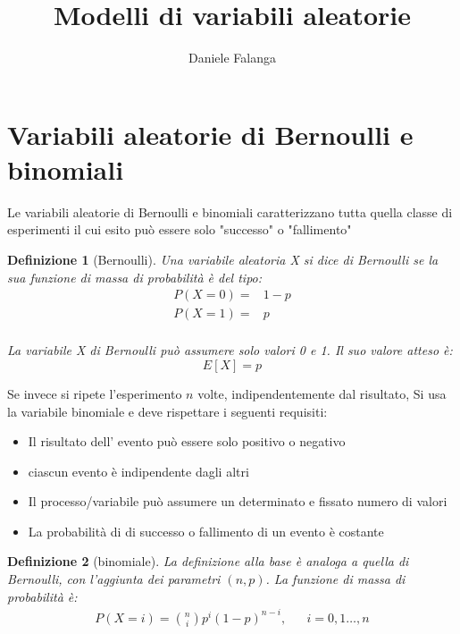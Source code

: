 \documentclass[12pt]{article}
\title{\textbf{Modelli di variabili aleatorie}}
\author{Daniele Falanga}
\date{}
\newtheorem{definition}{Definizione}[section]
\begin{document}
\maketitle

\section{Variabili aleatorie di Bernoulli e binomiali}
Le variabili aleatorie di Bernoulli e binomiali caratterizzano tutta quella classe
di esperimenti il cui esito può essere solo "successo" o "fallimento"

\begin{definition}[Bernoulli]
    Una variabile aleatoria X si dice di Bernoulli se la sua funzione di massa
    di probabilità è del tipo: 
    \begin{align*}
        P(X = 0) = & 1-p \\
        P(X=1) = &  p \\
    \end{align*}

    La variabile X di Bernoulli può assumere solo valori 0 e 1. 
    \newline
    Il suo valore atteso è:
    \[
    E[X] = p    
    \]
\end{definition}

Se invece si ripete l'esperimento \(n\) volte, indipendentemente dal risultato, 
Si usa la variabile binomiale e deve rispettare i seguenti requisiti:
\begin{itemize}
    \item Il risultato dell' evento può essere solo positivo o negativo
    \item ciascun evento è indipendente dagli altri
    \item Il processo/variabile può assumere un determinato e fissato numero di valori
    \item La probabilità di di successo o fallimento di un evento è costante
\end{itemize}

\begin{definition}[binomiale]
    La definizione alla base è analoga a quella di Bernoulli, con l'aggiunta dei parametri
    \((n,p)\). 
    \newline
    La funzione di massa di probabilità è: 
    \begin{align*}
        P(X = i) = \binom{n}{i}p^i(1-p)^{n-i}, & & i = 0,1\dots,n
    \end{align*}
\end{definition}
\end{document}
